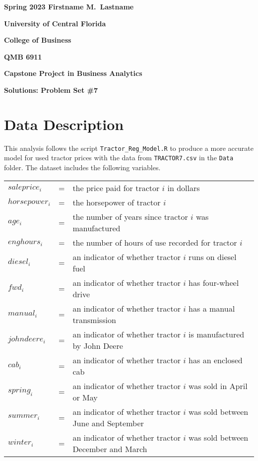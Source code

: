 \documentclass[11pt]{paper}
\begin{document}

\pagestyle{empty}
{\noindent\bf Spring 2023 \hfill Firstname M.~Lastname}
\vskip 16pt
\centerline{\bf University of Central Florida}
\centerline{\bf College of Business}
\vskip 16pt
\centerline{\bf QMB 6911}
\centerline{\bf Capstone Project in Business Analytics}
\vskip 10pt
\centerline{\bf Solutions:  Problem Set \#7}
\vskip 32pt
\noindent

\section{Data Description}

This analysis follows the script \texttt{Tractor\_Reg\_Model.R} to produce a more accurate model for used tractor prices with the data from \texttt{TRACTOR7.csv} in the \texttt{Data} folder. 
The dataset includes the following variables.
\begin{table}[h!]
\begin{tabular}{l l l}

$saleprice_i$ & = & the price paid for tractor $i$ in dollars \\
% 
$horsepower_i$ & = & the horsepower of tractor $i$ \\
$age_i$ & = & the number of years since tractor $i$ was manufactured  \\
$enghours_i$ & = & the number of hours of use recorded for tractor $i$  \\
$diesel_i$ & = & an indicator of whether tractor $i$ runs on diesel fuel \\ %
$fwd_i$ & = & an indicator of whether tractor $i$ has four-wheel drive \\ %
$manual_i$ & = & an indicator of whether tractor $i$ has a manual transmission \\ %
$johndeere_i$ & = & an indicator of whether tractor $i$ is manufactured by John Deere \\ %
$cab_i$ & = & an indicator of whether tractor $i$ has an enclosed cab \\ %
% 
$spring_i$ & = & an indicator of whether tractor $i$ was sold in April or May \\ %
$summer_i$ & = & an indicator of whether tractor $i$ was sold between June and September \\ %
$winter_i$ & = & an indicator of whether tractor $i$ was sold between December and March \\ %

\end{tabular}
\end{table}
%
\end{document}
